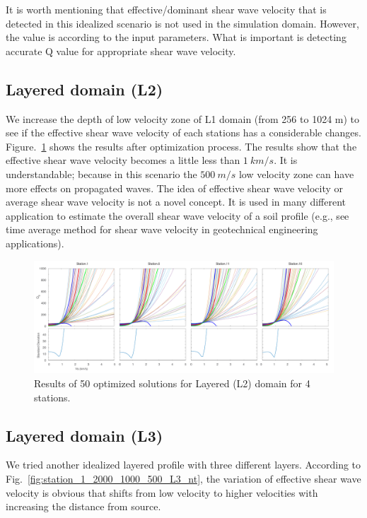 It is worth mentioning that effective/dominant shear wave velocity that is detected in this idealized scenario is not used in the simulation domain. However, the value is according to the input parameters. What is important is detecting accurate Q value for appropriate shear wave velocity. 


\subsection{Layered domain (L2)}

We increase the depth of low velocity zone of L1 domain (from 256 to 1024 m) to see if the effective shear wave velocity of each stations has a considerable changes. Figure.~\ref{fig:station_1_1000_500_2_L2} shows the results after optimization process. The results show that the effective shear wave velocity becomes a little less than $1~km/s$. It is understandable; because in this scenario the $500~m/s$ low velocity zone can have more effects on propagated waves.  The idea of effective shear wave velocity or average shear wave velocity is not a novel concept. It is used in many different application to estimate the overall shear wave velocity of a soil profile (e.g., see time average method for shear wave velocity in geotechnical engineering applications).  

  \begin{figure}[ht]
    \centering
    \includegraphics[width=\textwidth]{figures/pdf/station_1_1000_500_2_L2.pdf}
    \caption{Results of 50 optimized solutions for Layered (L2) domain for 4 stations.}
    \label{fig:station_1_1000_500_2_L2}
\end{figure}

\subsection{Layered domain (L3)}

We tried another idealized layered profile with three different layers. According to Fig.~\ref{fig:station_1_2000_1000_500_L3_nt}, the variation of effective shear wave velocity is obvious that shifts from low velocity to higher velocities with increasing the distance from source. 


